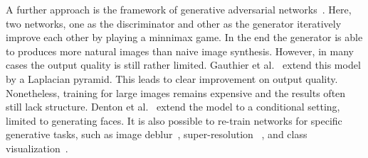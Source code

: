 \documentclass[10pt,twocolumn,letterpaper]{article}
\begin{document}

A further approach is the framework of generative adversarial networks~\cite{Goodfellow2014}. Here, two networks, one as the discriminator and other as the generator iteratively improve each other by playing a minnimax game. In the end the generator is able to produces more natural images than naive image synthesis. However, in many cases the output quality is still rather limited. Gauthier et al.~\cite{Gauthier15} extend this model by a Laplacian pyramid. This leads to clear improvement on output quality. Nonetheless, training for large images remains expensive and the results often still lack structure. Denton et al.~\cite{Denton15} extend the model to a conditional setting, limited to generating faces. It is also possible to re-train networks for specific generative tasks, such as image deblur~\cite{Xu15}, super-resolution ~\cite{Dong15}, and class visualization~\cite{Lu15}. 
\end{document}
